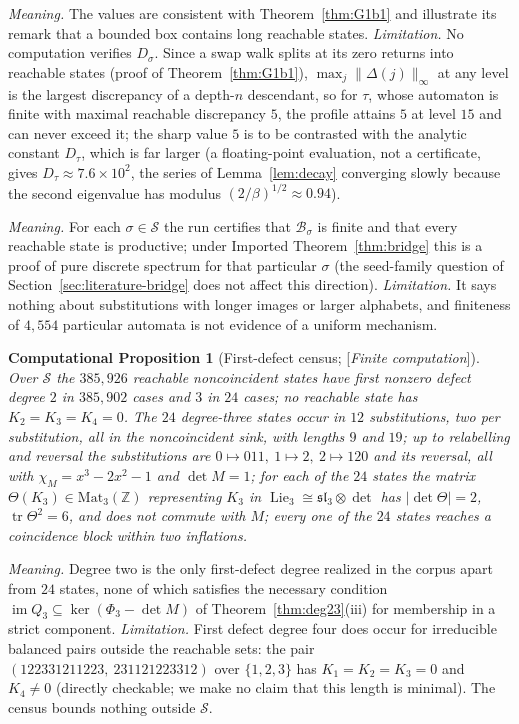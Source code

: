 \documentclass[11pt]{amsart}
\theoremstyle{plain}
\newtheorem{computation}[theorem]{Computational Proposition}
\theoremstyle{definition}
\theoremstyle{remark}
\newcommand{\Z}{\mathbb{Z}}
\newcommand{\B}{\mathcal{B}}
\newcommand{\Lie}{\operatorname{Lie}}
\newcommand{\PDS}{pure discrete spectrum}
\newcommand{\Status}[1]{\textup{[\textit{#1}]}}
\begin{document}
\emph{Meaning.} The values are consistent with Theorem~\ref{thm:G1b1} and illustrate its remark that a bounded box contains long reachable states. \emph{Limitation.} No computation verifies $D_\sigma$. Since a swap walk splits at its zero returns into reachable states (proof of Theorem~\ref{thm:G1b1}), $\max_j\|\Delta(j)\|_\infty$ at any level is the largest discrepancy of a depth-$n$ descendant, so for $\tau$, whose automaton is finite with maximal reachable discrepancy $5$, the profile attains $5$ at level $15$ and can never exceed it; the sharp value $5$ is to be contrasted with the analytic constant $D_\tau$, which is far larger (a floating-point evaluation, not a certificate, gives $D_\tau\approx7.6\times10^2$, the series of Lemma~\ref{lem:decay} converging slowly because the second eigenvalue has modulus $(2/\beta)^{1/2}\approx0.94$).

\emph{Meaning.} For each $\sigma\in\mathcal S$ the run certifies that $\B_\sigma$ is finite and that every reachable state is productive; under Imported Theorem~\ref{thm:bridge} this is a proof of \PDS{} for that particular $\sigma$ (the seed-family question of Section~\ref{sec:literature-bridge} does not affect this direction). \emph{Limitation.} It says nothing about substitutions with longer images or larger alphabets, and finiteness of $4{,}554$ particular automata is not evidence of a uniform mechanism.

\begin{computation}[First-defect census; \Status{Finite computation}]\label{comp:defect}
Over $\mathcal S$ the $385{,}926$ reachable noncoincident states have first nonzero defect degree $2$ in $385{,}902$ cases and $3$ in $24$ cases; no reachable state has $K_2=K_3=K_4=0$. The $24$ degree-three states occur in $12$ substitutions, two per substitution, all in the noncoincident sink, with lengths $9$ and $19$; up to relabelling and reversal the substitutions are $0\mapsto011,\ 1\mapsto2,\ 2\mapsto120$ and its reversal, all with $\chi_M=x^3-2x^2-1$ and $\det M=1$; for each of the $24$ states the matrix $\Theta(K_3)\in\mathrm{Mat}_3(\Z)$ representing $K_3$ in $\Lie_3\cong\mathfrak{sl}_3\otimes\det$ has $|\det\Theta|=2$, $\operatorname{tr}\Theta^2=6$, and does not commute with $M$; every one of the $24$ states reaches a coincidence block within two inflations.
\end{computation}

\emph{Meaning.} Degree two is the only first-defect degree realized in the corpus apart from $24$ states, none of which satisfies the necessary condition $\operatorname{im}Q_3\subseteq\ker(\Phi_3-\det M)$ of Theorem~\ref{thm:deg23}(iii) for membership in a strict component. \emph{Limitation.} First defect degree four does occur for irreducible balanced pairs outside the reachable sets: the pair $(122331211223,\ 231121223312)$ over $\{1,2,3\}$ has $K_1=K_2=K_3=0$ and $K_4\ne0$ (directly checkable; we make no claim that this length is minimal). The census bounds nothing outside $\mathcal S$.
\end{document}
